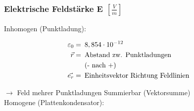 \subsubsection*{Elektrische Feldstärke E $\left[\frac{V}{m}\right]$}

    Inhomogen (Punktladung):
    \vspace{-1mm}
    \begin{minipage}{0.53\linewidth}
        \begin{footnotesize}
            \begin{center}
            \end{center}
        \end{footnotesize}
    \end{minipage}
    \vspace{1mm}
    \begin{minipage}{0.46\linewidth}
        \begin{scriptsize}
            \begin{center}
                \begin{align*}
                    \varepsilon_0 = &\enspace 8,854\cdot10^{-12}
                    \\\vec{r} = &\text{\enspace Abstand zw. Punktladungen}
                    \\&\text{\enspace(- nach +)}
                    \\\vec{e_r} = &\text{\enspace Einheitsvektor Richtung Feldlinien}
                \end{align*}
            \end{center}
        \end{scriptsize}
    \end{minipage}
    \vspace{2mm}
    $\longrightarrow$ Feld mehrer Punktladungen Summierbar (Vektorsumme)\\
    Homogene (Plattenkondensator):

